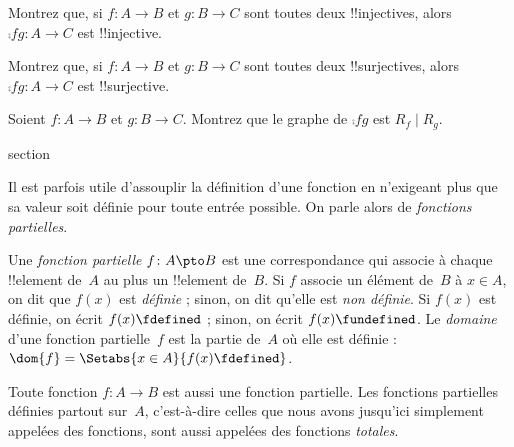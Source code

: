 \documentclass[11pt,a4paper,openany]{memoir}
\begin{document}
\begin{prob}
Montrez que, si $f\colon A \to B$ et $g\colon B \to C$ sont toutes deux
!!{injective}s, alors $\comp{f}{g}\colon A \to C$ est !!{injective}.
\end{prob}

\begin{prob}
Montrez que, si $f\colon A \to B$ et $g\colon B \to C$ sont toutes deux
!!{surjective}s, alors $\comp{f}{g}\colon A \to C$ est !!{surjective}.
\end{prob}

\begin{prob}
Soient $f\colon A \to B$ et $g\colon B \to C$. Montrez que le graphe
de $\comp{f}{g}$ est $R_f \mid R_g$.
\end{prob}


\endgroup




\begingroup
\expandafter\def\csname ol@sectioncs\endcsname{section}
\def\olfilename{partial-functions}




\begin{explain}
Il est parfois utile d’assouplir la définition d’une fonction en
n’exigeant plus que sa valeur soit définie pour toute entrée possible.
On parle alors de \emph{fonctions partielles}.
\end{explain}

\begin{defn}
Une \emph{fonction partielle} $f\colon A \pto B$ est une correspondance
qui associe à chaque !!{element} de~$A$ au plus un !!{element} de~$B$.
Si $f$ associe un élément de~$B$ à $x \in A$, on dit que $f(x)$ est
\emph{définie} ; sinon, on dit qu’elle est \emph{non définie}.
Si $f(x)$ est définie, on écrit $f(x) \fdefined$ ; sinon,
on écrit $f(x) \fundefined$. Le \emph{domaine} d’une fonction
partielle~$f$ est la partie de~$A$ où elle est définie :
$\dom{f} = \Setabs{x \in A}{f(x) \fdefined}$.
\end{defn}

\begin{ex}
Toute fonction $f\colon A \to B$ est aussi une fonction partielle.
Les fonctions partielles définies partout sur~$A$, c’est-à-dire celles
que nous avons jusqu’ici simplement appelées des fonctions, sont aussi
appelées des fonctions \emph{totales}.
\end{ex}
\end{document}
